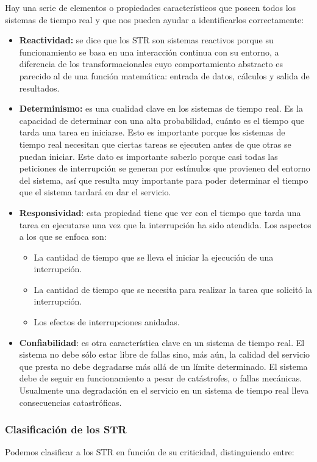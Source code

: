 Hay una serie de elementos o propiedades característicos que poseen todos los sistemas de
tiempo real y que nos pueden ayudar a identificarlos correctamente:
\begin{itemize}
    \item \textbf{Reactividad:} se dice que los STR son sistemas reactivos porque su funcionamiento se basa en una interacción continua con su entorno, a diferencia de los transformacionales cuyo comportamiento abstracto es parecido al de una función matemática: entrada de datos, cálculos y salida de resultados.

    \item \textbf{Determinismo:} es una cualidad clave en los sistemas de tiempo real. Es la capacidad de determinar con una alta probabilidad, cuánto es el tiempo que tarda una tarea en iniciarse. Esto es importante porque los sistemas de tiempo real necesitan que ciertas tareas se ejecuten antes de que otras se puedan iniciar. Este dato es importante saberlo porque casi todas las peticiones de interrupción se generan por estímulos que provienen del entorno del sistema, así que resulta muy importante para poder determinar el tiempo que el sistema tardará en dar el servicio.
    \item \textbf{Responsividad}: esta propiedad tiene que ver con el tiempo que tarda una tarea en ejecutarse una vez que la interrupción ha sido atendida. Los aspectos a los que se enfoca son:
        \begin{itemize}
            \item La cantidad de tiempo que se lleva el iniciar la ejecución de una interrupción.
            \item La cantidad de tiempo que se necesita para realizar la tarea que solicitó la interrupción.
            \item Los efectos de interrupciones anidadas.
        \end{itemize}
    \item \textbf{Confiabilidad}: es otra característica clave en un sistema de tiempo real. El sistema no debe sólo estar libre de fallas sino, más aún, la calidad del servicio que presta no debe degradarse más allá de un límite determinado. El sistema debe de seguir en funcionamiento a pesar de catástrofes, o fallas mecánicas. Usualmente una degradación en el servicio en un sistema de tiempo real lleva consecuencias catastróficas.
\end{itemize}

\subsubsection{Clasificación de los STR}
Podemos clasificar a los STR en función de su criticidad, distinguiendo entre:

